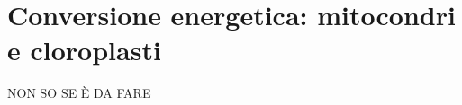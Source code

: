 \chapter{Conversione energetica: mitocondri e cloroplasti}
\begin{Huge}
	NON SO SE \`E DA FARE
\end{Huge}

